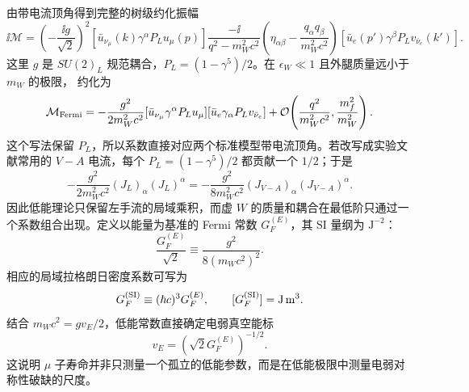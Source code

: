 由带电流顶角得到完整的树级约化振幅
\begin{equation}
 \ii\mathcal M
 =\left(-\frac{\ii g}{\sqrt2}\right)^2
 \left[\bar u_{\nu_\mu}(k)\gamma^\alpha P_Lu_\mu(p)\right]
 \frac{-\ii}{q^2-m_W^2c^2}
 \left(\eta_{\alpha\beta}-\frac{q_\alpha q_\beta}{m_W^2c^2}\right)
 \left[\bar u_e(p')\gamma^\beta P_Lv_{\bar\nu_e}(k')\right].
 \label{eq:muon-full-w-amplitude-dp11}
\end{equation}
这里 $g$ 是 $SU(2)_L$ 规范耦合，$P_L=(1-\gamma^5)/2$。在 $\epsilon_W\ll1$ 且外腿质量远小于 $m_W$ 的极限， 约化为
\begin{equation}
 \mathcal M_{\rm Fermi}
 =-\frac{g^2}{2m_W^2c^2}
 [\bar u_{\nu_\mu}\gamma^\alpha P_Lu_\mu]
 [\bar u_e\gamma_\alpha P_Lv_{\bar\nu_e}]
 +\mathcal O\!\left(\frac{q^2}{m_W^2c^2},\frac{m_f^2}{m_W^2}\right).
 \label{eq:fermi-amplitude-pl-dp11}
\end{equation}
这个写法保留 $P_L$，所以系数直接对应两个标准模型带电流顶角。若改写成实验文献常用的 $V-A$ 电流，每个 $P_L=(1-\gamma^5)/2$ 都贡献一个 $1/2$；于是
\begin{equation*}
-\frac{g^2}{2m_W^2c^2}
(J_L)_\alpha(J_L)^\alpha
=-\frac{g^2}{8m_W^2c^2}
(J_{V-A})_\alpha(J_{V-A})^\alpha.
\end{equation*}
因此低能理论只保留左手流的局域乘积，而虚 $W$ 的质量和耦合在最低阶只通过一个系数组合出现。定义以能量为基准的 Fermi 常数 $G_F^{(E)}$，其 SI 量纲为 $\mathrm{J^{-2}}$：
\begin{equation}
 {
 \frac{G_F^{(E)}}{\sqrt2}
 \equiv\frac{g^2}{8(m_Wc^2)^2}.}
 \label{eq:gf-matching-dp11}
\end{equation}
相应的局域拉格朗日密度系数可写为
\begin{equation*}
 G_F^{(\rm SI)}\equiv(\hbar c)^3G_F^{(E)},
 \qquad [G_F^{(\rm SI)}]=\mathrm{J\,m^3}.
\end{equation*}
结合 $m_Wc^2=gv_E/2$，低能常数直接确定电弱真空能标
\begin{equation}
 {v_E=\left(\sqrt2G_F^{(E)}\right)^{-1/2}.}
 \label{eq:vev-from-gf-dp11}
\end{equation}
这说明 $\mu$ 子寿命并非只测量一个孤立的低能参数，而是在低能极限中测量电弱对称性破缺的尺度。

